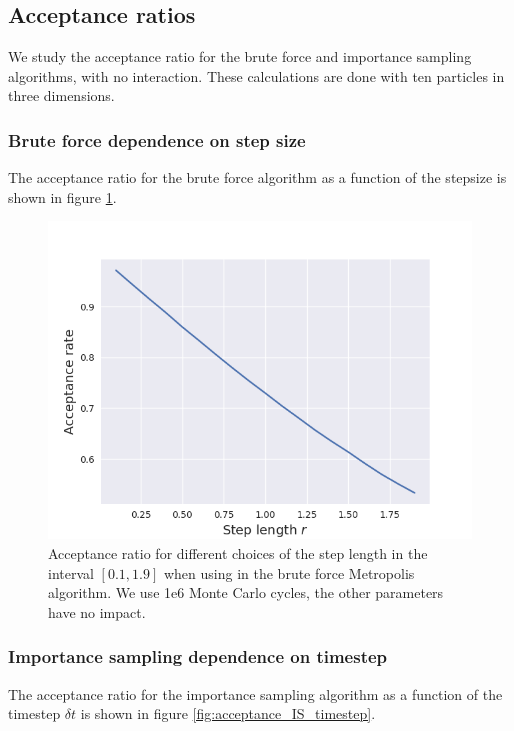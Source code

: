\documentclass[norsk,a4paper,12pt]{article}
\begin{document}
\subsection{Acceptance ratios}
We study the acceptance ratio for the brute force and importance sampling algorithms, with no interaction. These calculations are done with ten particles in three dimensions.

\subsubsection{Brute force dependence on step size}
The acceptance ratio for the brute force algorithm as a function of the stepsize is shown in figure \ref{fig:acceptance_BF_stepsize}. 

\begin{figure} [H]
	\centering
	\includegraphics[scale=0.65]{images/acceptance_BF.png}
	\caption{Acceptance ratio for different choices of the step length in the interval $[0.1,1.9]$ when using in the brute force Metropolis algorithm. We use 1e6 Monte Carlo cycles, the other parameters have no impact.}
	\label{fig:acceptance_BF_stepsize}
\end{figure} 

\subsubsection{Importance sampling dependence on timestep}
The acceptance ratio for the importance sampling algorithm as a function of the timestep $\delta t$ is shown in figure \ref{fig:acceptance_IS_timestep}. 
\end{document}
